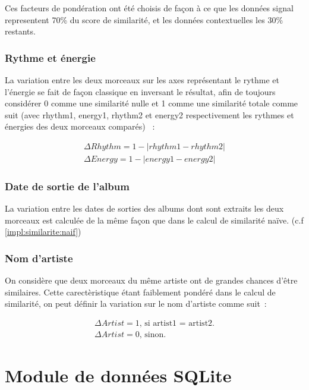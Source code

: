 Ces facteurs de pondération ont été choisis de façon à ce que les données
signal representent 70\% du score de similarité, et les données contextuelles
les 30\% restants.

\subsubsection{Rythme et énergie}
\label{impl:similarite:complet:rhythm}

La variation entre les deux morceaux sur les axes représentant le rythme et
l'énergie se fait de façon classique en inversant le résultat, afin de toujours
considérer 0 comme une similarité nulle et 1 comme une similarité totale comme
suit (avec rhythm1, energy1, rhythm2 et energy2 respectivement les rythmes et
énergies des deux morceaux comparés) ~:

\begin{align}
  \Delta Rhythm = 1 - |rhythm1 - rhythm2|\\
  \Delta Energy = 1 - |energy1 - energy2|
\end{align}

\subsubsection{Date de sortie de l'album}
\label{impl:similarite:complet:date}

La variation entre les dates de sorties des albums dont sont extraits les deux
morceaux est calculée de la même façon que dans le calcul de similarité naïve.
(c.f \ref{impl:similarite:naif})

\subsubsection{Nom d'artiste}
\label{impl:similarite:complet:name}

On considère que deux morceaux du même artiste ont de grandes chances d'être
similaires. Cette carectèristique étant faiblement pondéré dans le calcul de
similarité, on peut définir la variation sur le nom d'artiste comme suit~:

\begin{align}
  \Delta Artist = \text{1, si artist1 = artist2.}\\
  \Delta Artist = \text{0, sinon.}
\end{align}

\section{Module de données SQLite}
\label{implementation:sqlite}


